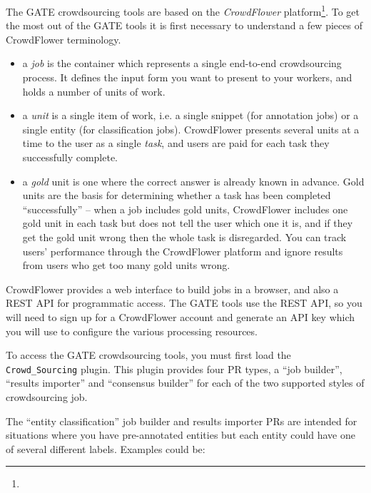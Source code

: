 
The GATE crowdsourcing tools are based on the \emph{CrowdFlower}
platform\footnote{}.  To get the most out
of the GATE tools it is first necessary to understand a few pieces of
CrowdFlower terminology.

\begin{itemize}
\item a \emph{job} is the container which represents a single end-to-end
  crowdsourcing process.  It defines the input form you want to present to your
  workers, and holds a number of units of work.
\item a \emph{unit} is a single item of work, i.e. a single snippet (for
  annotation jobs) or a single entity (for classification jobs).  CrowdFlower
  presents several units at a time to the user as a single \emph{task}, and
  users are paid for each task they successfully complete.
\item a \emph{gold} unit is one where the correct answer is already known in
  advance.  Gold units are the basis for determining whether a task has been
  completed ``successfully'' -- when a job includes gold units, CrowdFlower
  includes one gold unit in each task but does not tell the user which one it
  is, and if they get the gold unit wrong then the whole task is disregarded.
  You can track users' performance through the CrowdFlower platform and ignore
  results from users who get too many gold units wrong.
\end{itemize}

CrowdFlower provides a web interface to build jobs in a browser, and also a
REST API for programmatic access.  The GATE tools use the REST API, so you will
need to sign up for a CrowdFlower account and generate an API key which you
will use to configure the various processing resources.

To access the GATE crowdsourcing tools, you must first load the
\verb!Crowd_Sourcing! plugin.  This plugin provides four PR types, a ``job
builder'', ``results importer'' and ``consensus builder'' for each of the two
supported styles of crowdsourcing job.


The ``entity classification'' job builder and results importer PRs are intended
for situations where you have pre-annotated entities but each entity could have
one of several different labels.  Examples could be:

